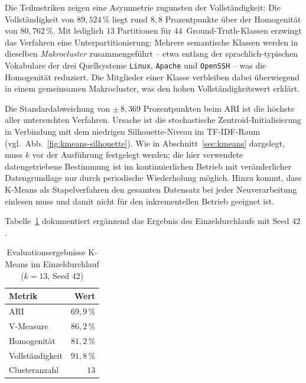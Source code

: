 Die Teilmetriken zeigen eine Asymmetrie zugunsten der Vollständigkeit: Die
Vollständigkeit von $89{,}524\,\%$ liegt rund $8{,}8$ Prozentpunkte über der
Homogenität von $80{,}762\,\%$. Mit lediglich $13$ Partitionen für
$44$~Ground-Truth-Klassen erzwingt das Verfahren eine Unterpartitionierung:
Mehrere semantische Klassen werden in dieselben \emph{Makrocluster}
zusammengeführt -- etwa entlang der sprachlich-typischen Vokabulare der drei
Quellsysteme \texttt{Linux}, \texttt{Apache} und \texttt{OpenSSH} -- was die
Homogenität reduziert. Die Mitglieder einer Klasse verbleiben dabei
überwiegend in einem gemeinsamen Makrocluster, was den hohen
Vollständigkeitswert erklärt.

Die Standardabweichung von $\pm\,8{,}369$ Prozentpunkten beim ARI ist die
höchste aller untersuchten Verfahren. Ursache ist die stochastische
Zentroid-Initialisierung in Verbindung mit dem niedrigen Silhouette-Niveau im
TF-IDF-Raum (vgl.\ Abb.~\ref{fig:kmeans-silhouette}). Wie in
Abschnitt~\ref{sec:kmeans} dargelegt, muss $k$ vor der Ausführung festgelegt
werden; die hier verwendete datengetriebene Bestimmung ist im
kontinuierlichen Betrieb mit veränderlicher Datengrundlage nur durch
periodische Wiederholung möglich. Hinzu kommt, dass K-Means als
Stapelverfahren den gesamten Datensatz bei jeder Neuverarbeitung einlesen
muss und damit nicht für den inkrementellen Betrieb geeignet ist.

Tabelle~\ref{tab:eval:kmeans:single} dokumentiert ergänzend das Ergebnis des
Einzeldurchlaufs mit Seed $42$.

\begin{table}[h]
    \centering
    \caption{Evaluationsergebnisse K-Means im Einzeldurchlauf ($k = 13$, Seed $42$)}
    \label{tab:eval:kmeans:single}
    \begin{tabular}{lr}
        \toprule
        Metrik & Wert \\
        \midrule
        ARI             & $69{,}9\,\%$ \\
        V-Measure       & $86{,}2\,\%$ \\
        Homogenität     & $81{,}2\,\%$ \\
        Vollständigkeit & $91{,}8\,\%$ \\
        \midrule
        Clusteranzahl   & $13$ \\
        \bottomrule
    \end{tabular}
\end{table}

